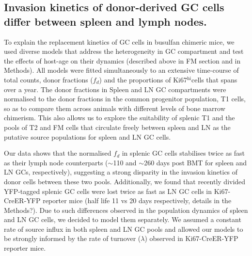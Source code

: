 \documentclass[11pt,onecolumn]{article}
\newcommand{\khi}{Ki67$^\text{hi}$}
\begin{document}
	\subsection*{Invasion kinetics of donor-derived GC cells differ between spleen and lymph nodes.}
	To explain the replacement  kinetics of GC cells in busulfan chimeric mice, we used diverse models that address the heterogeneity in GC compartment and test the effects of host-age on their dynamics (described above in FM section and in Methods).
	All models were fitted simultaneously to an extensive time-course of total counts, donor fractions ($f_{d}$) and the proportions of \khi cells that spans over a year.
	The donor fractions in Spleen and LN GC compartments were normalised to the donor fractions in the common progenitor population,  T1 cells, so as to compare them across animals with different levels of bone marrow chimerism.
	This also allows us to explore the suitability of splenic T1 and the pools of T2 and FM cells that circulate freely between spleen and LN as the putative source populations for spleen and LN GC cells. 
	
	Our data shows that the normalised $f_{d}$ in splenic GC cells stabilises twice as fast as their lymph node counterparts ($\sim$110 and $\sim$260 days post BMT for spleen and LN GCs, respectively), suggesting a strong disparity in the invasion kinetics of donor cells between these two pools. 
	Additionally, we found that recently divided YFP-tagged splenic GC cells were lost twice as fast as LN GC cells in Ki67-CreER-YFP reporter mice (half life 11 vs 20 days respectively, details in the Methods?).
	Due to such differences observed in the population dynamics of spleen and LN GC cells, we decided to model them separately.
	We assumed a constant rate of source influx in both spleen and LN GC pools and allowed our models to be strongly informed by the rate of turnover ($\lambda$) observed in Ki67-CreER-YFP reporter mice.
	
\end{document}
